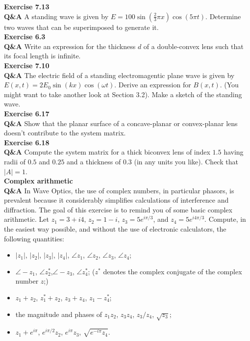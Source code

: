 \documentclass[main.tex]{subfiles}
\begin{document}
\textbf{Exercise 7.13}\\
\textbf{Q\&A} A standing wave is given by $E=100\sin(\frac{2}{3}\pi x) \cos( 5\pi t)$. Determine two waves that can be superimposed to generate it.\\

\textbf{Exercise 6.3}\\
\textbf{Q\&A} Write an  expression for the thickness $d$ of a double-convex lens such that its focal length is infinite.\\

\textbf{Exercise 7.10}\\
\textbf{Q\&A} The electric field of a standing electromagentic plane wave is given by $E(x,t) = 2E_0 \sin (kx) \cos(\omega t)$. Derive an expression for $B(x,t)$. (You might want to take another look at Section 3.2). Make a sketch of the standing wave.\\

\textbf{Exercise 6.17}\\
\textbf{Q\&A} Show that the planar surface of a concave-planar or convex-planar lens doesn't contribute to the system matrix.\\

\textbf{Exercise 6.18}\\
\textbf{Q\&A} Compute the system matrix for a thick biconvex lens of index $1.5$ having radii of $0.5$ and $0.25$ and a thickness of $0.3$ (in any units you like). Check that $|A| = 1$.\\

\textbf{Complex arithmetic}\\
\textbf{Q\&A} In Wave Optics, the use of complex numbers, in particular phasors, is prevalent because it considerably simplifies calculations of interference and diffraction. The goal of this exercise is to remind you of some basic complex arithmetic. Let $z_1 = 3 + i4$, $z_2 = 1-i$, $z_3 = 5e^{i\pi /3}$, and $z_4=5e^{i4\pi/3}$. Compute, in the easiest way possible, and without the use of electronic calculators, the following quantities:

\begin{itemize}
  \item $|z_1|$, $|z_2|$, $|z_3|$, $|z_4|$, $\angle z_1$, $\angle z_2$, $\angle z_3$, $\angle z_4$;
  \item $\angle -z_1$, $\angle z_2^*$,$\angle -z_3$, $\angle z_4^*$; ($z^*$ denotes the complex conjugate of the complex number $z$;)
  \item $z_1 + z_2$, $z_1^* + z_2$, $z_3 + z_4$, $z_1 - z_4^*$;
  \item the magnitude and phases of  $z_1 z_2$, $z_3 z_4$, $z_3 / z_4$, $\sqrt{z_3}$;
  \item $z_1 + e^{i \pi}$, $e^{i \pi / 2}z_2$, $e^{i\pi}z_3$, $\sqrt{e^{-i\pi}z_4}$.
\end{itemize}
\end{document}
